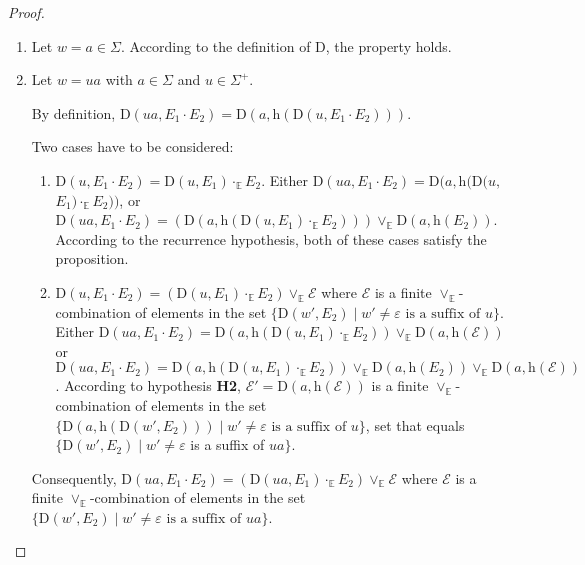 \documentclass{article}
\begin{document}
\begin{proof}
          \begin{enumerate}
            \item Let $w=a\in\Sigma$. According to the definition of $\mathrm{D}$, the property holds.
            \item Let $w=ua$ with $a\in\Sigma$ and $u\in\Sigma^{+}$.
            
            By definition, $\mathrm{D}(ua,E_1\cdot E_2)=\mathrm{D}(a,\mathrm{h}(\mathrm{D}(u,E_1\cdot E_2)))$.
            
            Two cases have to be considered:
             
             \begin{enumerate}
               \item $\mathrm{D}(u,E_1\cdot E_2)=\mathrm{D}(u,E_1) \cdot_{\mathbb{E}} E_2$. Either $\mathrm{D}(ua,E_1\cdot E_2)=\mathrm{D}(a,\mathrm{h}(\mathrm{D}(u,$ $E_1) \cdot_{\mathbb{E}} E_2))$, or $\mathrm{D}(ua,E_1\cdot E_2)=(\mathrm{D}(a,\mathrm{h}(\mathrm{D}(u,E_1) \cdot_{\mathbb{E}} E_2 )))  \vee_{\mathbb{E}} \mathrm{D}(a,\mathrm{h}(E_2)) $. According to the recurrence hypothesis, both of these cases satisfy the proposition.
               
               \item $\mathrm{D}(u,E_1\cdot E_2)=(\mathrm{D}(u,E_1) \cdot_{\mathbb{E}} E_2 ) \vee_{\mathbb{E}} \mathcal{E} $ where $\mathcal{E}$ is a finite $\vee_{\mathbb{E}}$-combination of elements in the set $\{\mathrm{D}(w',E_2)\mid w'\neq\varepsilon\text{ is a suffix of }u\}$. Either $\mathrm{D}(ua,E_1\cdot E_2)=\mathrm{D}(a,\mathrm{h}(\mathrm{D}(u,E_1) \cdot_{\mathbb{E}} E_2 )) \vee_{\mathbb{E}} \mathrm{D}(a,\mathrm{h}(\mathcal{E})) $ or $\mathrm{D}(ua,E_1\cdot E_2)=\mathrm{D}(a,\mathrm{h}(\mathrm{D}(u,E_1) \cdot_{\mathbb{E}} E_2 ))               
               \vee_{\mathbb{E}} \mathrm{D}(a,\mathrm{h}(E_2))               
               \vee_{\mathbb{E}} \mathrm{D}(a,\mathrm{h}(\mathcal{E}))$. According to hypothesis \textbf{H2}, $\mathcal{E}'=\mathrm{D}(a,\mathrm{h}(\mathcal{E}))$ is a finite $\vee_{\mathbb{E}}$-combination of elements in the set $\{\mathrm{D}(a,\mathrm{h}(\mathrm{D}(w',E_2)))\mid w'\neq\varepsilon \text{ is a suffix of }u\}$, set that equals $\{\mathrm{D}(w',E_2)\mid w'\neq\varepsilon$ is a suffix of $ua\}$.
             \end{enumerate} 
             
             Consequently, $\mathrm{D}(ua,E_1\cdot E_2)=(\mathrm{D}(ua,E_1) \cdot_{\mathbb{E}} E_2 ) \vee_{\mathbb{E}}   \mathcal{E} $ where $\mathcal{E}$ is a finite $\vee_{\mathbb{E}}$-combination of elements in the set $\{\mathrm{D}(w',E_2)\mid w'\neq\varepsilon\text{ is a suffix of }ua\}$. 
          \end{enumerate} 
          

\end{proof}
\end{document}
